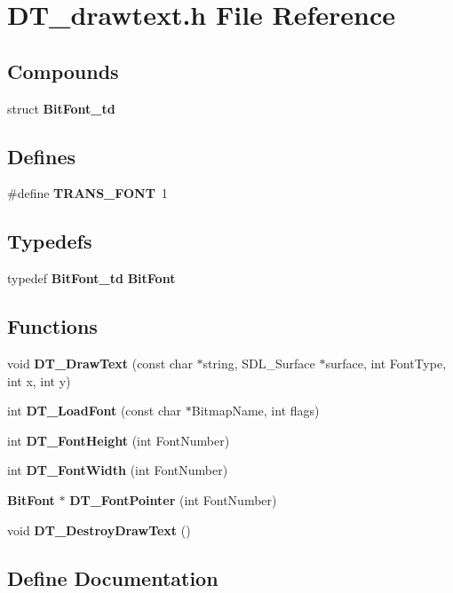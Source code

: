 \section{DT\_\-drawtext.h File Reference}
\label{DT__drawtext_8h}
\subsection*{Compounds}
\begin{CompactItemize}
\item 
struct {\bf Bit\-Font\_\-td}
\end{CompactItemize}
\subsection*{Defines}
\begin{CompactItemize}
\item 
\#define {\bf TRANS\_\-FONT}\ 1
\end{CompactItemize}
\subsection*{Typedefs}
\begin{CompactItemize}
\item 
typedef {\bf Bit\-Font\_\-td} {\bf Bit\-Font}
\end{CompactItemize}
\subsection*{Functions}
\begin{CompactItemize}
\item 
void {\bf DT\_\-Draw\-Text} (const char $\ast$string, SDL\_\-Surface $\ast$surface, int Font\-Type, int x, int y)
\item 
int {\bf DT\_\-Load\-Font} (const char $\ast$Bitmap\-Name, int flags)
\item 
int {\bf DT\_\-Font\-Height} (int Font\-Number)
\item 
int {\bf DT\_\-Font\-Width} (int Font\-Number)
\item 
{\bf Bit\-Font} $\ast$ {\bf DT\_\-Font\-Pointer} (int Font\-Number)
\item 
void {\bf DT\_\-Destroy\-Draw\-Text} ()
\end{CompactItemize}


\subsection{Define Documentation}
